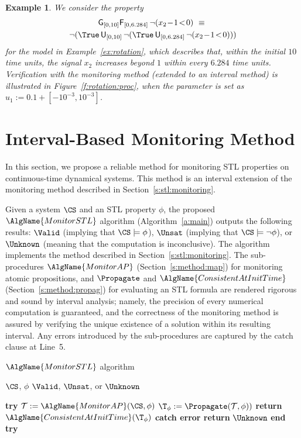 \documentclass[paper]{ieice}
\newcommand{\Until}{\mathsf{U}}
\newcommand{\Always}{\mathsf{G}}
\newcommand{\Eventually}{\mathsf{F}}
\newtheorem{example}{Example}
\begin{document}
\begin{example} \label{ex:stl}
	We consider the property 
	\begin{multline*}
		\Always_{[0,10]} \Eventually_{[0,6.284]}\, \neg (x_2\!-\!1 \!<\! 0) ~\equiv~\\
		\neg( \True \,\Until_{[0,10]}\, \neg ( \True \,\Until_{[0,6.284]}\, \neg(x_2\!-\!1 \!<\! 0) ))
	\end{multline*}
	for the model in Example~\ref{ex:rotation}, which describes that, within the initial $10$ time units, the signal $x_2$ increases beyond $1$ within every $6.284$ time units.
	Verification with the monitoring method (extended to an interval method) is illustrated in Figure~\ref{f:rotation:proc}, when the parameter is set as $u_1 := 0.1+[-10^{-3},10^{-3}]$.
\end{example}


\section{Interval-Based Monitoring Method}
\label{s:method}

In this section, we propose a reliable method for monitoring STL properties on continuous-time dynamical systems. This method is an interval extension of the monitoring method described in Section~\ref{s:stl:monitoring}.

Given a system $\CS$ and an STL property $\phi$, the proposed $\AlgName{MonitorSTL}$ algorithm (Algorithm~\ref{a:main}) outputs the following results:
$\Valid$ (implying that $\CS \models \phi$),
$\Unsat$ (implying that $\CS \models \neg\phi$), or
$\Unknown$ (meaning that the computation is inconclusive).
The algorithm implements the method described in Section~\ref{s:stl:monitoring}.
The sub-procedures $\AlgName{MonitorAP}$ (Section~\ref{s:method:map}) for monitoring atomic propositions, and $\Propagate$ and $\AlgName{ConsistentAtInitTime}$ (Section~\ref{s:method:propag}) for evaluating an STL formula are rendered rigorous and sound by interval analysis;
namely, the precision of every numerical computation is guaranteed, and the correctness of the monitoring method is assured by verifying the unique existence of a solution within its resulting interval.
Any errors introduced by the sub-procedures are captured by the catch clause at Line~5.

\begin{algorithm}[thb]
\caption{\label{a:main} $\AlgName{MonitorSTL}$ algorithm}

\begin{algorithmic}[1]
  \REQUIRE $\CS$, $\phi$
  \ENSURE $\Valid$, $\Unsat$, or $\Unknown$

  \STATE \textbf{try}
  \STATE \quad $\mathcal{T} := \AlgName{MonitorAP}(\CS, \phi)$
  \hfill{}
  \STATE \quad $\T_\phi := \Propagate(\mathcal{T}, \phi))$
  \hfill{}
  \STATE \quad \textbf{return} {$\AlgName{ConsistentAtInitTime}(\T_\phi)$}
  \hfill{}
  \STATE \textbf{catch error return} $\Unknown$ \textbf{end try}
\end{algorithmic}
\end{algorithm}
\end{document}

